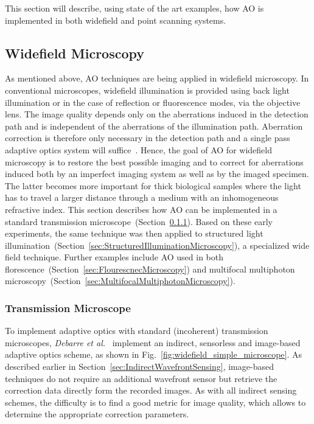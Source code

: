 This section will describe, using state of the art examples, how AO is implemented in both widefield and point scanning systems.  


\subsection{Widefield Microscopy}
\label{sec:WidefieldMicroscopy}

As mentioned above, AO techniques are being applied in widefield microscopy. In conventional microscopes, widefield illumination is provided using back light illumination or in the case of reflection or fluorescence modes, via the objective lens. The image quality depends only on the aberrations induced in the detection path and is independent of the aberrations of the illumination path. Aberration correction is therefore only necessary in the detection path and a single pass adaptive optics system will suffice~\cite{Aberrations_book}. Hence, the goal of AO for widefield microscopy is to restore the best possible imaging and to correct for aberrations induced both by an imperfect imaging system as well as by the imaged specimen. The latter becomes more important for thick biological samples where the light has to travel a larger distance through 
a medium with an inhomogeneous refractive index. 
This section describes how AO can be implemented in a standard transmission microscope~(Section~\ref{sec:TransmissionMicroscope}). Based on these early experiments, the same technique was then applied to structured light illumination~(Section~\ref{sec:StructuredIlluminationMicroscopy}), a specialized wide field technique. Further examples include AO used in both florescence~(Section~\ref{sec:FlourescnecMicroscopy}) and multifocal multiphoton microscopy~(Section~\ref{sec:MultifocalMultiphotonMicroscopy}). 

\subsubsection{Transmission Microscope}
\label{sec:TransmissionMicroscope}
To implement adaptive optics with standard (incoherent) transmission microscopes, \emph{Debarre et al.}~\cite{wide_AOM_loew_freq} implement an indirect, sensorless and image-based adaptive optics scheme, as shown in Fig.~\ref{fig:widefield_simple_microscope}. As described earlier in Section~\ref{sec:IndirectWavefrontSensing}, image-based techniques do not require an additional wavefront sensor but retrieve the correction data directly form the recorded images. As with all indirect sensing schemes, the difficulty is to find a good metric for image quality, which allows to determine the appropriate correction parameters.

